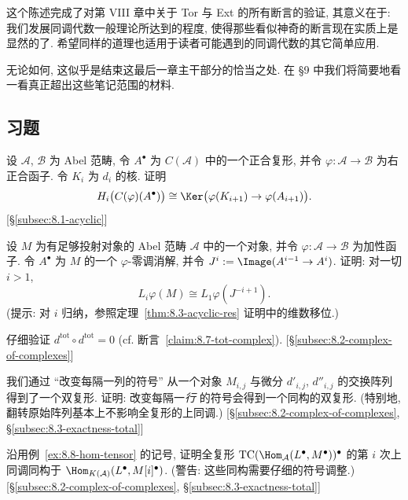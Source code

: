 这个陈述完成了对第 VIII 章中关于 Tor 与 Ext 的所有断言的验证, 其意义在于: 我们发展同调代数一般理论所达到的程度, 使得那些看似神奇的断言现在实质上是显然的了. 希望同样的道理也适用于读者可能遇到的同调代数的其它简单应用.

无论如何, 这似乎是结束这最后一章主干部分的恰当之处. 在 §9 中我们将简要地看一看真正超出这些笔记范围的材料.

\subsection*{习题}
{}

\begin{prob}\label{ex:8.1}
设 $\mathcal{A}$, $\mathcal{B}$ 为 Abel 范畴, 令 $A^\bullet$ 为 $C(\mathcal{A})$ 中的一个正合复形, 并令 $\varphi:\mathcal{A}\to\mathcal{B}$ 为右正合函子. 令 $K_i$ 为 $d_i$ 的核. 证明
\[
H_i\bigl(C(\varphi)(A^\bullet)\bigr)\cong \Ker\bigl(\varphi(K_{i+1})\to \varphi(A_{i+1})\bigr).
\]
[\S\ref{subsec:8.1-acyclic}]
\end{prob}

\begin{prob}\label{ex:8.2}
设 $M$ 为有足够投射对象的 Abel 范畴 $\mathcal{A}$ 中的一个对象, 并令 $\varphi:\mathcal{A}\to\mathcal{B}$ 为加性函子. 令 $A^\bullet$ 为 $M$ 的一个 $\varphi$-零调消解, 并令 $J^i:=\Image(A^{i-1}\to A^i)$. 证明: 对一切 $i>1$,
\[
L_i\varphi(M)\cong L_1\varphi(J^{-i+1}).
\]
(提示: 对 $i$ 归纳，参照定理~\ref{thm:8.3-acyclic-res} 证明中的维数移位.)
\end{prob}

\begin{prob}\label{ex:8.3}
仔细验证 $d^{\mathrm{tot}}\circ d^{\mathrm{tot}}=0$ (cf. 断言~\ref{claim:8.7-tot-complex}). [\S\ref{subsec:8.2-complex-of-complexes}]
\end{prob}

\begin{prob}\label{ex:8.4}
我们通过 ``改变每隔一列的符号'' 从一个对象 $M_{i,j}$ 与微分 $d'_{i,j}$, $d''_{i,j}$ 的交换阵列得到了一个双复形. 证明: 改变每隔一\emph{行} 的符号会得到一个同构的双复形. (特别地, 翻转原始阵列基本上不影响全复形的上同调.) [\S\ref{subsec:8.2-complex-of-complexes}, \S\ref{subsec:8.3-exactness-total}]
\end{prob}

\begin{prob}\label{ex:8.5}
沿用例~\ref{ex:8.8-hom-tensor} 的记号, 证明全复形 $\mathrm{TC}(\Hom_{\mathcal{A}}(L^\bullet, M^\bullet))^\bullet$ 的第 $i$ 次上同调同构于 $\Hom_{K(\mathcal{A})}(L^\bullet, M[i]^\bullet)$. (警告: 这些同构需要仔细的符号调整.) [\S\ref{subsec:8.2-complex-of-complexes}, \S\ref{subsec:8.3-exactness-total}]
\end{prob}

